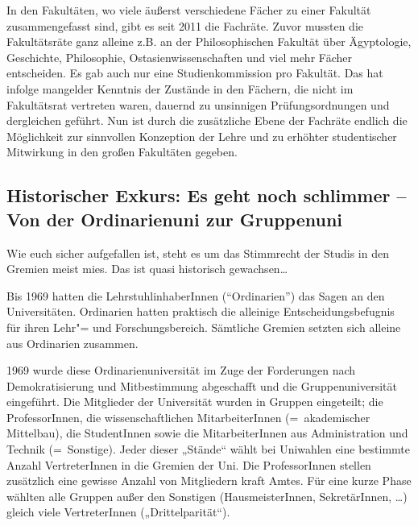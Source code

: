 In den Fakultäten, wo viele äußerst verschiedene Fächer zu einer Fakultät zusammengefasst sind, gibt es seit 2011 die Fachräte. Zuvor mussten die Fakultätsräte ganz alleine z.B. an der Philosophischen Fakultät über Ägyptologie, Geschichte, Philosophie, Ostasienwissenschaften und viel mehr Fächer entscheiden. Es gab auch nur eine Studienkommission pro Fakultät. Das hat infolge mangelder Kenntnis der Zustände in den Fächern, die nicht im Fakultätsrat vertreten waren, dauernd zu unsinnigen Prüfungsordnungen und dergleichen geführt. Nun ist durch die zusätzliche Ebene der Fachräte endlich die Möglichkeit zur sinnvollen Konzeption der Lehre und zu erhöhter studentischer Mitwirkung in den großen Fakultäten gegeben.

\subsection{Historischer Exkurs: Es geht noch schlimmer -- Von der Ordinarienuni zur Gruppenuni}

Wie euch sicher aufgefallen ist, steht es um das Stimmrecht der Studis in den Gremien meist mies. Das ist quasi historisch gewachsen\dots

Bis 1969 hatten die LehrstuhlinhaberInnen ("`Ordinarien"') das Sagen an den Universitäten. Ordinarien hatten praktisch die alleinige Entscheidungsbefugnis
für ihren Lehr"= und Forschungsbereich. Sämtliche Gremien setzten sich alleine aus Ordinarien zusammen.

1969 wurde diese Ordinarienuniversität im Zuge der Forderungen nach Demokratisierung und Mitbestimmung abgeschafft und die Gruppenuniversität eingeführt. Die Mitglieder der Universität wurden in Gruppen eingeteilt; die ProfessorInnen, die wissenschaftlichen MitarbeiterInnen (=\ akademischer Mittelbau), die
StudentInnen sowie die MitarbeiterInnen aus Administration und Technik (=\ Sonstige). Jeder dieser „Stände“ wählt bei Uniwahlen eine bestimmte Anzahl VertreterInnen in die Gremien der Uni. Die ProfessorInnen stellen zusätzlich eine gewisse Anzahl von Mitgliedern kraft Amtes. Für eine kurze Phase wählten alle Gruppen außer den Sonstigen (HausmeisterInnen, SekretärInnen, \dots) gleich viele VertreterInnen („Drittelparität“).

